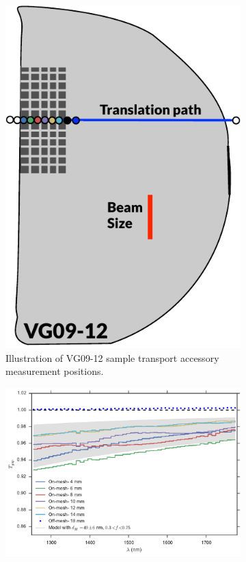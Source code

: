 \begin{figure}[htbp]
    \centering
    \begin{subfigure}[b]{0.35\textwidth}
        \includegraphics[width=\textwidth]{chSiGaps/figs/VG09_12_STA_illustration.pdf}
        \caption{Illustration of VG09-12 sample transport accessory measurement positions. \label{figVG0912_STA_illus} }
    \end{subfigure}
    \begin{subfigure}[b]{0.65\textwidth}
        \includegraphics[width=\textwidth]{chSiGaps/figs/VG0912_STA_scan_coarse.pdf}

\end{subfigure}
\end{figure}
